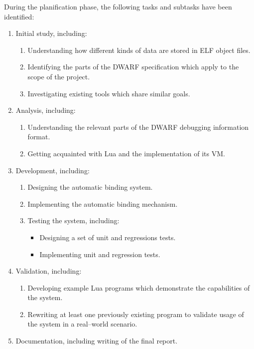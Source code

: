 During the planification phase, the following tasks and subtasks have been
identified:

\begin{enumerate}
	\item Initial study, including:
		\begin{enumerate}
			\item Understanding how different kinds of data are stored in \gls{ELF}
				object files.
			\item Identifying the parts of the \gls{DWARF} specification which apply
				to the scope of the project.
			\item Investigating existing tools which share similar goals.
		\end{enumerate}

	\item Analysis, including:
		\begin{enumerate}
			\item Understanding the relevant parts of the \gls{DWARF}
				debugging information format.
			\item Getting acquainted with Lua and the implementation
				of its \gls{VM}.
		\end{enumerate}

	\item Development, including:
		\begin{enumerate}
			\item Designing the automatic binding system.
			\item Implementing the automatic binding mechanism.
			\item Testing the system, including:
				\begin{itemize}
					\item Designing a set of unit and regressions tests.
					\item Implementing unit and regression tests.
				\end{itemize}
		\end{enumerate}

	\item Validation, including:
		\begin{enumerate}
			\item Developing example Lua programs which demonstrate the
				capabilities of the system.
			\item Rewriting at least one previously existing program to
				validate usage of the system in a real--world scenario.
		\end{enumerate}

	\item Documentation, including writing of the final report.
\end{enumerate}


